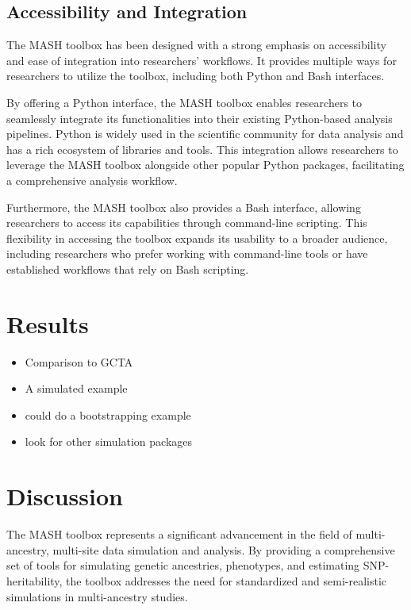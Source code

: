 \documentclass[sn-nature]{sn-jnl}%
\begin{document}
\subsection{Accessibility and Integration}
The MASH toolbox has been designed with a strong emphasis on accessibility and ease of integration into researchers' workflows. It provides multiple ways for researchers to utilize the toolbox, including both Python and Bash interfaces.

By offering a Python interface, the MASH toolbox enables researchers to seamlessly integrate its functionalities into their existing Python-based analysis pipelines. Python is widely used in the scientific community for data analysis and has a rich ecosystem of libraries and tools. This integration allows researchers to leverage the MASH toolbox alongside other popular Python packages, facilitating a comprehensive analysis workflow.

Furthermore, the MASH toolbox also provides a Bash interface, allowing researchers to access its capabilities through command-line scripting. This flexibility in accessing the toolbox expands its usability to a broader audience, including researchers who prefer working with command-line tools or have established workflows that rely on Bash scripting.

\section{Results}\label{sec:results}
\begin{itemize}
  \item Comparison to GCTA
  \item A simulated example
  \item could do a bootstrapping example
  \item look for other simulation packages
\end{itemize}

\section{Discussion}\label{sec:discussion}

The MASH toolbox represents a significant advancement in the field of multi-ancestry, multi-site data simulation and analysis. By providing a comprehensive set of tools for simulating genetic ancestries, phenotypes, and estimating SNP-heritability, the toolbox addresses the need for standardized and semi-realistic simulations in multi-ancestry studies.
\end{document}
